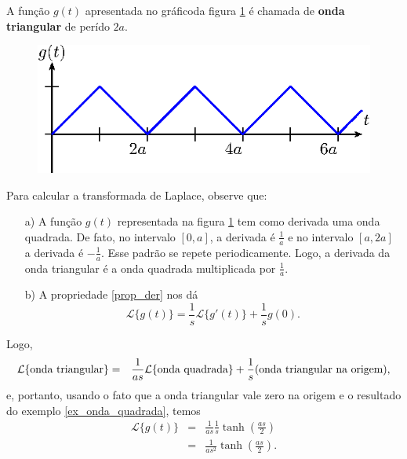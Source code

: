 \begin{ex}A função $g(t)$ apresentada no gráficoda figura \ref{fig_onda_triangular} é chamada de {\bf onda triangular} de perído $2a$.
 \begin{figure}[!ht]
\begin{center}

\includegraphics{cap_especiais_coef_var/pics/figura_2}\end{center}
\caption{\label{fig_onda_triangular}}
\end{figure}
Para calcular a transformada de Laplace, observe que:
\begin{itemize}
 \item[a)] A função $g(t)$ representada na figura \ref{fig_onda_triangular} tem como derivada uma onda quadrada. De fato, no intervalo $[0,a]$, a derivada é $\frac{1}{a}$ e no intervalo $[a,2a]$ a derivada é $-\frac{1}{a}$. Esse padrão se repete periodicamente. Logo, a derivada da onda triangular é a onda quadrada multiplicada por $\frac{1}{a}$.
 \item[b)] A propriedade \ref{prop_der} nos dá
 \begin{equation}
 \mathcal{L}\{g(t)\}=\frac{1}{s}\mathcal{L}\{g'(t)\}+\frac{1}{s}g(0).
 \end{equation}
\end{itemize}
Logo,
\begin{eqnarray*}
\mathcal{L}\{\hbox{onda triangular}\}&=&\frac{1}{as}\mathcal{L}\{\hbox{onda quadrada}\}+\frac{1}{s}\hbox{(onda triangular na origem)},
\end{eqnarray*}
e, portanto, usando o fato que a onda triangular vale zero na origem e o resultado do exemplo \ref{ex_onda_quadrada}, temos
\begin{eqnarray*}
\mathcal{L}\{g(t)\}&=&\frac{1}{as}\frac{1}{s} \tanh\left(\frac{as}{2}\right)\\
&=&\frac{1}{as^2} \tanh\left(\frac{as}{2}\right).
\end{eqnarray*}
\end{ex}

